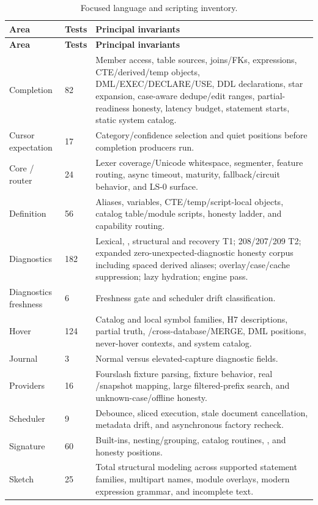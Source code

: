 \documentclass[11pt]{article}
\newcommand{\code}[1]{\texttt{\detokenize{#1}}}
\begin{document}
\begin{longtable}{@{}p{}p{}p{}@{}}
\caption{Focused language and scripting inventory.}\label{tab:tests}\\
\toprule
\textbf{Area} & \textbf{Tests} & \textbf{Principal invariants}\\
\midrule
\endfirsthead
\toprule
\textbf{Area} & \textbf{Tests} & \textbf{Principal invariants}\\
\midrule
\endhead
Completion & 82 & Member access, table sources, joins/FKs, expressions, CTE/derived/temp objects, DML/EXEC/DECLARE/USE, DDL declarations, star expansion, case-aware dedupe/edit ranges, partial-readiness honesty, latency budget, statement starts, static system catalog.\\
Cursor expectation & 17 & Category/confidence selection and quiet positions before completion producers run.\\
Core / router & 24 & Lexer coverage/Unicode whitespace, segmenter, feature routing, async timeout, maturity, fallback/circuit behavior, and LS-0 surface.\\
Definition & 56 & Aliases, variables, CTE/temp/script-local objects, catalog table/module scripts, honesty ladder, and capability routing.\\
Diagnostics & 182 & Lexical, \code{GO}, structural and recovery T1; 208/207/209 T2; expanded zero-unexpected-diagnostic honesty corpus including spaced derived aliases; overlay/case/cache suppression; lazy hydration; engine pass.\\
Diagnostics freshness & 6 & Freshness gate and scheduler drift classification.\\
Hover & 124 & Catalog and local symbol families, H7 descriptions, partial truth, \code{USE}/cross-database/MERGE, DML positions, never-hover contexts, and system catalog.\\
Journal & 3 & Normal versus elevated-capture diagnostic fields.\\
Providers & 16 & Fourslash fixture parsing, fixture behavior, real \code{CatalogBuilder}/snapshot mapping, large filtered-prefix search, and unknown-case/offline honesty.\\
Scheduler & 9 & Debounce, sliced execution, stale document cancellation, metadata drift, and asynchronous factory recheck.\\
Signature & 60 & Built-ins, nesting/grouping, catalog routines, \code{EXEC}, and honesty positions.\\
Sketch & 25 & Total structural modeling across supported statement families, multipart names, module overlays, modern expression grammar, and incomplete text.\\

\end{longtable}
\end{document}
